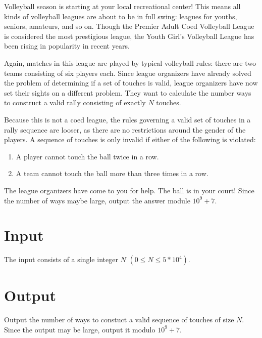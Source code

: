 
Volleyball season is starting at your local recreational center! This means all kinds of volleyball
leagues are about to be in full swing: leagues for youths, seniors, amateurs, and so on. Though the
Premier Adult Coed Volleyball League is considered the most prestigious league, the Youth Girl's
Volleyball League has been rising in popularity in recent years.

Again, matches in this league are played by typical volleyball rules: there are two teams consisting of six
players each. Since league organizers have already solved the problem of determining if a set of touches is
valid, league organizers have now set their sights on a different problem. They want to
calculate the number ways to construct a valid rally consisting of exactly $N$ touches.

Because this is not a coed league, the rules governing a valid set of touches in a rally sequence 
are looser, as there are no restrictions around the gender of the players. A sequence of touches is only
invalid if either of the following is violated:

\begin{enumerate}
    \item A player cannot touch the ball twice in a row.
    \item A team cannot touch the ball more than three times in a row.
\end{enumerate}

The league organizers have come to you for help. The ball is in your court! Since the number of ways
maybe large, output the answer module $10^9 + 7$.

\section*{Input}

The input consists of a single integer $N$ $(0 \leq N \leq 5 * 10^4)$.

\section*{Output}

Output the number of ways to constuct a valid sequence of touches of size $N$. Since the output may be
large, output it modulo $10^9 + 7$.

